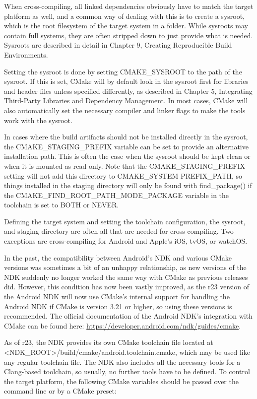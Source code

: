 When cross-compiling, all linked dependencies obviously have to match the target platform as well, and a common way of dealing with this is to create a sysroot, which is the root filesystem of the target system in a folder. While sysroots may contain full systems, they are often stripped down to just provide what is needed. Sysroots are described in detail in Chapter 9, Creating Reproducible Build Environments.

Setting the sysroot is done by setting CMAKE\_SYSROOT to the path of the sysroot. If this is set, CMake will by default look in the sysroot first for libraries and header files unless specified differently, as described in Chapter 5, Integrating Third-Party Libraries and Dependency Management. In most cases, CMake will also automatically set the necessary compiler and linker flags to make the tools work with the sysroot.

In cases where the build artifacts should not be installed directly in the sysroot, the CMAKE\_STAGING\_PREFIX variable can be set to provide an alternative installation path. This is often the case when the sysroot should be kept clean or when it is mounted as read-only. Note that the CMAKE\_STAGING\_PREFIX setting will not add this directory to CMAKE\_SYSTEM PREFIX\_PATH, so things installed in the staging directory will only be found with find\_package() if the CMAKE\_FIND\_ROOT\_PATH\_MODE\_PACKAGE variable in the toolchain is set to BOTH or NEVER.

Defining the target system and setting the toolchain configuration, the sysroot, and staging directory are often all that are needed for cross-compiling. Two exceptions are cross-compiling for Android and Apple's iOS, tvOS, or watchOS.


In the past, the compatibility between Android's NDK and various CMake versions was sometimes a bit of an unhappy relationship, as new versions of the NDK suddenly no longer worked the same way with CMake as previous releases did. However, this condition has now been vastly improved, as the r23 version of the Android NDK will now use CMake's internal support for handling the Android NDK if CMake is version 3.21 or higher, so using these versions is recommended. The official documentation of the Android NDK's integration with CMake can be found here: \url{https://developer.android.com/ndk/guides/cmake}.

As of r23, the NDK provides its own CMake toolchain file located at <NDK\_ROOT>/build/cmake/android.toolchain.cmake, which may be used like any regular toolchain file. The NDK also includes all the necessary tools for a Clang-based toolchain, so usually, no further tools have to be defined. To control the target platform, the following CMake variables should be passed over the command line or by a CMake preset:

